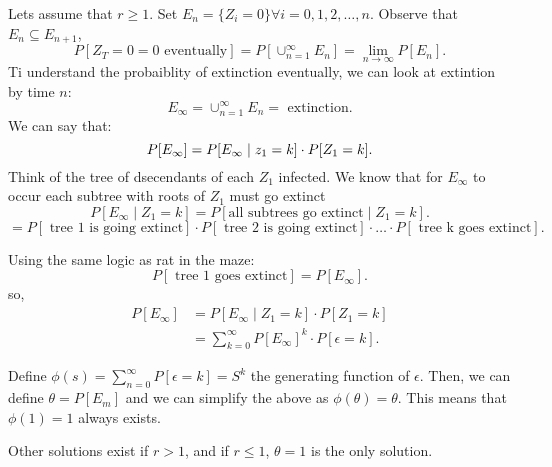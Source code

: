 \documentclass[a4paper]{article}
\begin{document}
Lets assume that $r \geq 1$. Set  $E_n = \{Z_i = 0\} \forall i = 0,1,2,\ldots,n $. Observe that $E_n \subseteq E_{n+1}$,
\[
  P[Z_T=0= 0 \text{ eventually}] = P[\cup_{n=1}^{\infty} E_n] = \lim_{n \to \infty} P[E_n]
.\] 
Ti understand the probaiblity of extinction eventually, we can look at extintion by time  $n$:
 \[
E_{\infty} = \cup_{n=1}^{\infty} E_n = \text{ extinction}
.\] 
We can say that:
\[
  P[E_{\infty}] = P[E_{\infty} \mid z_1 = k] \cdot P[Z_1 = k] \\
.\]
Think of the tree of dsecendants of each $Z_1$ infected. We know that for  $E_{\infty}$ to occur each subtree with roots of  $Z_1$ must go extinct 
 \[
   P[E_{\infty} \mid Z_1= k] = P[\text{all subtrees go extinct} \mid Z_1=k]
 .\]
 \[
  = P[\text{ tree 1 is going extinct}] \cdot P[\text{ tree 2 is going extinct}] \cdot \ldots \cdot P[\text{ tree k goes extinct}] 
 .\] 

 Using the same logic as rat in the maze:
 \[
   P[ \text{ tree 1 goes extinct}] = P[E_{\infty}] 
 .\] 
 so,
 \begin{align*}
   P[E_{\infty}] &= P[E_{\infty} \mid Z_1 = k] \cdot P[Z_1 = k] \\
                 &= \sum_{k=0}^{\infty} P[E_{\infty}]^{k} \cdot P[\epsilon = k] 
 .\end{align*}

 \begin{definition}
   Define $\phi(s) = \sum_{n=0}^{\infty} P[\epsilon = k] = S^{k}$ the generating function of $\epsilon$. Then, we can define $\theta = P[E_m]$ and we can simplify the above as  $\phi(\theta) = \theta$. This means that $\phi(1) = 1$ always exists.
 \end{definition}

 \begin{note}
   Other solutions exist if $r > 1$, and if  $r \leq 1$,  $\theta = 1$ is the only solution.
 \end{note}
\end{document}
